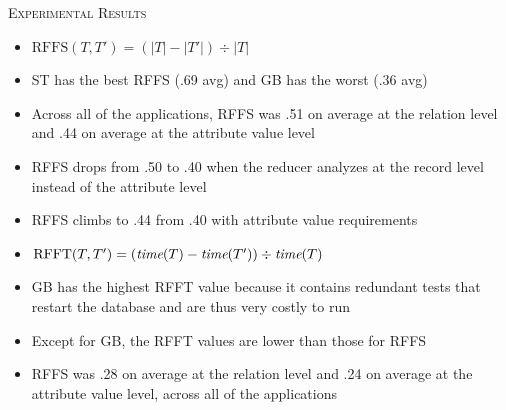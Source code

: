 \documentclass[final,t]{beamer}
\begin{document}
\begin{frame}{}
\begin{columns}[t]
\begin{column}{.325\linewidth}
\begin{block}{\textsc{Experimental Results}}
          \begin{itemize}

            \item $\mbox{RFFS}(T, T') = (|T|-|T'|) \div |T|$

            \item ST has the best RFFS (.69 avg) and GB has the worst
              (.36 avg)

            \item Across all of the applications, RFFS was .51 on
              average at the relation level and .44 on average at the
              attribute value level

            \item RFFS drops from .50 to .40 when the reducer analyzes
              at the record level instead of the attribute level

            \item RFFS climbs to .44 from .40 with attribute value
              requirements

          \end{itemize}

          \vspace*{.1in}

                    

          \vspace*{-.5in}          

          \begin{itemize}

            \item $\mbox{RFFT}(T, T') = (\mbox{{\em time}}(T)-\mbox{{\em
                time}}(T')) \div \mbox{{\em time}}(T)$

            \item GB has the highest RFFT value because it contains
              redundant tests that restart the database and are thus
              very costly to run

            \item Except for GB, the RFFT values are lower than those
              for RFFS


            \item RFFS was .28 on average at the relation level and
              .24 on average at the attribute value level, across all
              of the applications


\end{itemize}
\end{block}
\end{column}
\end{columns}
\end{frame}
\end{document}
